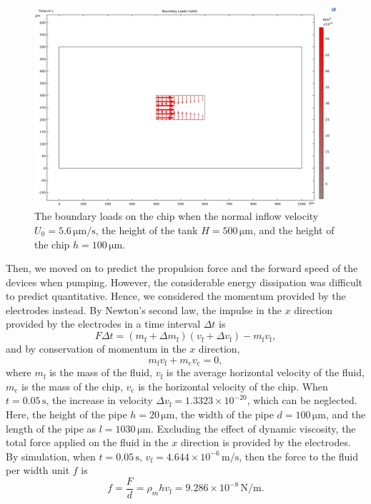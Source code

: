 \documentclass[journal,svgnames,twocolumn,x11names]{IEEEtran}
\begin{document}
\begin{figure}[htbp]
    \centering
    \includegraphics[scale=0.5]{loads.png}
    \caption{The boundary loads on the chip when the normal inflow velocity $U_0=5.6\,\mathrm{\mu m/s}$, the height of the tank $H=500\,\mathrm{\mu m}$, and the height of the chip $h=100\,\mathrm{\mu m}$.}
    \label{fig:loads}
\end{figure}

Then, we moved on to predict the propulsion force and the forward speed of the devices when pumping. However, the considerable energy dissipation was difficult to predict quantitative. Hence, we considered the momentum provided by the electrodes instead. By Newton's second law, the impulse in the $x$ direction provided by the electrodes in a time interval $\Delta t$ is
\begin{equation}
    F\Delta t=(m_\text{f}+\Delta m_\text{f})(v_\text{f}+\Delta v_\text{f})-m_\text{f}v_\text{f},
\end{equation}
and by conservation of momentum in the $x$ direction,
\begin{equation}
    m_\text{f}v_\text{f}+m_\text{c}v_\text{c}=0,
\end{equation}
where $m_\text{f}$ is the mass of the fluid, $v_\text{f}$ is the average horizontal velocity of the fluid, $m_\text{c}$ is the mass of the chip, $v_\text{c}$ is the horizontal velocity of the chip. When $t=0.05\,\text{s}$, the increase in velocity $\Delta v_\text{f}=1.3323\times10^{-20}$, which can be neglected. Here, the height of the pipe $h=20\,\mathrm{\mu m}$, the width of the pipe $d=100\,\mathrm{\mu m}$, and the length of the pipe as $l=1030\,\mathrm{\mu m}$. Excluding the effect of dynamic viscosity, the total force applied on the fluid in the $x$ direction is provided by the electrodes. By simulation, when $t=0.05\,\text{s}$, $v_\text{f}=4.644\times10^{-6}\,\mathrm{m/s}$, then the force to the fluid per width unit $f$ is
\begin{equation}
    f=\frac{F}{d}=\rho_mhv_\text{f}=9.286\times10^{-8}\,\mathrm{N/m}.
\end{equation}
\end{document}
